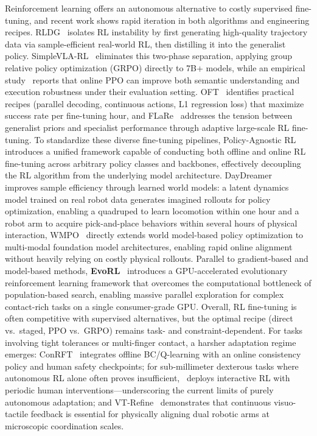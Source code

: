 \documentclass[acmsmall,screen,review,anonymous]{acmart}
\begin{document}
Reinforcement learning offers an autonomous alternative to costly supervised fine-tuning, and recent work shows rapid iteration in both algorithms and engineering recipes. RLDG~\cite{xu2024rldg} isolates RL instability by first generating high-quality trajectory data via sample-efficient real-world RL, then distilling it into the generalist policy. SimpleVLA-RL~\cite{li2025simplevla} eliminates this two-phase separation, applying group relative policy optimization (GRPO) directly to 7B+ models, while an empirical study~\cite{liu2026rlvla} reports that online PPO can improve both semantic understanding and execution robustness under their evaluation setting. OFT~\cite{kim2025oft} identifies practical recipes (parallel decoding, continuous actions, L1 regression loss) that maximize success rate per fine-tuning hour, and FLaRe~\cite{hu2024flare} addresses the tension between generalist priors and specialist performance through adaptive large-scale RL fine-tuning. To standardize these diverse fine-tuning pipelines, Policy-Agnostic RL~\cite{mark2024policyagnosticrl} introduces a unified framework capable of conducting both offline and online RL fine-tuning across arbitrary policy classes and backbones, effectively decoupling the RL algorithm from the underlying model architecture. DayDreamer~\cite{wu2023daydreamer} improves sample efficiency through learned world models: a latent dynamics model trained on real robot data generates imagined rollouts for policy optimization, enabling a quadruped to learn locomotion within one hour and a robot arm to acquire pick-and-place behaviors within several hours of physical interaction, WMPO~\cite{zhu2025wmpo} directly extends world model-based policy optimization to multi-modal foundation model architectures, enabling rapid online alignment without heavily relying on costly physical rollouts. 
Parallel to gradient-based and model-based methods, \textbf{EvoRL}~\cite{zheng2025evorl} introduces a GPU-accelerated evolutionary reinforcement learning framework that overcomes the computational bottleneck of population-based search, enabling massive parallel exploration for complex contact-rich tasks on a single consumer-grade GPU. 
Overall, RL fine-tuning is often competitive with supervised alternatives, but the optimal recipe (direct vs.\ staged, PPO vs.\ GRPO) remains task- and constraint-dependent. For tasks involving tight tolerances or multi-finger contact, a harsher adaptation regime emerges: ConRFT~\cite{chen2025conrft} integrates offline BC/Q-learning with an online consistency policy and human safety checkpoints; for sub-millimeter dexterous tasks where autonomous RL alone often proves insufficient,~\cite{luo2025humaninloop} deploys interactive RL with periodic human interventions---underscoring the current limits of purely autonomous adaptation; and VT-Refine~\cite{huang2025vtrefine} demonstrates that continuous visuo-tactile feedback is essential for physically aligning dual robotic arms at microscopic coordination scales.
\end{document}
